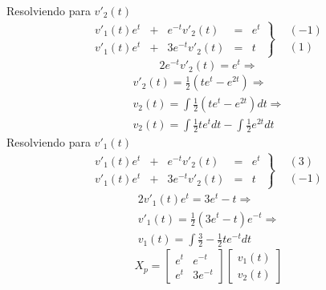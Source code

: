 \documentclass[12pt,spanish,lettersize,twocolumn]{article}
\begin{document}
Resolviendo para $v'_2(t)$
\begin{equation*}
\begin{array}{cc}
\left.
\begin{array}{rcrcr}
v'_1(t)e^t&+&e^{-t}v'_2(t) & = & e^t\\
v'_1(t)e^t&+&3e^{-t}v'_2(t) & = & t
\end{array}
\right\} & \begin{array}{c}
(-1)\\
(1)
\end{array}
\end{array}
\end{equation*}
\begin{equation}
2e^{-t}v'_2(t)  =  e^t\Rightarrow
\end{equation}
\begin{eqnarray}
v'_2(t)=\frac{1}{2}(te^t-e^{2t})\Rightarrow\\
v_2(t)=\int\frac{1}{2}(te^t-e^{2t})dt\Rightarrow\\
v_2(t)=\int\frac{1}{2}te^tdt-\int\frac{1}{2}e^{2t}dt\label{intV2}
\end{eqnarray}
Resolviendo para $v'_1(t)$
\begin{equation*}
\begin{array}{cc}
\left.
\begin{array}{rcrcr}
v'_1(t)e^t&+&e^{-t}v'_2(t) & = & e^t\\
v'_1(t)e^t&+&3e^{-t}v'_2(t) & = & t
\end{array}
\right\} & \begin{array}{c}
(3)\\
(-1)
\end{array}
\end{array}
\end{equation*}
\begin{eqnarray}
\nonumber 2v'_1(t)e^t  =  3e^t-t\Rightarrow\\
v'_1(t)= \frac{1}{2}(3e^t-t)e^{-t}\Rightarrow\\
v_1(t)=\int\frac{3}{2}-\frac{1}{2}te^{-t}dt\label{intV1}
\end{eqnarray}
\begin{equation}
X_p=\left[
\begin{array}{cc}
e^t & e^{-t}\\
e^t & 3e^{-t}
\end{array}
\right]\left[
\begin{array}{c}
v_1(t)\\
v_2(t)
\end{array}
\right]
\end{equation}
\end{document}
